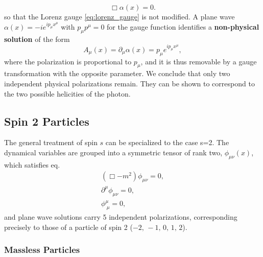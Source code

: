 \[
    \Box \alpha(x) = 0.
\]
so that the Lorenz gauge \eqref{eq:lorenz_gauge} is not modified. A plane wave \(\alpha(x) = -ie^{i p_\mu x^{\mu}}\) with \(p_\mu p^{\mu} = 0\) for the gauge function identifies a \textbf{non-physical solution} of the form
\[
    A_{\mu}(x) = \partial_\mu \alpha(x) = p_\mu e^{i p_\mu x^{\mu}},
\]
where the polarization is proportional to \(p_\mu\), and it is thus removable by a gauge transformation with the opposite parameter. We conclude that only two independent physical polarizations remain. They can be shown to correspond to the two possible helicities of the photon.

\subsection{Spin 2 Particles}

The general treatment of spin \(s\) can be specialized to the case s=2. The dynamical variables are grouped into a symmetric tensor of rank two, \(\phi_{\mu \nu}(x)\), which satisfies eq.
\[
    \begin{aligned}
        (\Box -m^2) \phi_{\mu \nu} = 0,    \\
        \partial^{\mu} \phi_{\mu \nu} = 0, \\
        \phi^{\mu}_{\ \mu} = 0,
    \end{aligned}
\]
and plane wave solutions carry 5 independent polarizations, corresponding precisely to those of a particle of spin 2 (\(-2,\,-1,\,0,\,1,\,2\)).

\subsubsection{Massless Particles}

